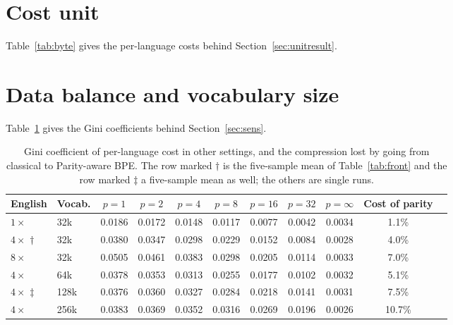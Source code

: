 \section{Cost unit}
\label{app:unit}

Table~\ref{tab:byte} gives the per-language costs behind Section~\ref{sec:unitresult}.

\begin{table}[h]
\centering
\small
{}
\caption{Tokens per sentence on devtest when the training cost is measured per byte or per
character (single runs) or per parallel sentence (five-sample mean, Table~\ref{tab:perlang}).}
\label{tab:byte}
\end{table}

\section{Data balance and vocabulary size}
\label{app:sens}

Table~\ref{tab:sens} gives the Gini coefficients behind Section~\ref{sec:sens}.

\begin{table}[h]
\centering
\small
\begin{tabular}{llccccccccc}
\toprule
English & Vocab. & $p=1$ & $p=2$ & $p=4$ & $p=8$ & $p=16$ & $p=32$ & $p=\infty$ & Cost of parity\\
\midrule
$1\times$ & 32k & 0.0186 & 0.0172 & 0.0148 & 0.0117 & 0.0077 & 0.0042 & 0.0034 & 1.1\%\\
$4\times$ $\dagger$ & 32k & 0.0380 & 0.0347 & 0.0298 & 0.0229 & 0.0152 & 0.0084 & 0.0028 & 4.0\%\\
$8\times$ & 32k & 0.0505 & 0.0461 & 0.0383 & 0.0298 & 0.0205 & 0.0114 & 0.0033 & 7.0\%\\
$4\times$ & 64k & 0.0378 & 0.0353 & 0.0313 & 0.0255 & 0.0177 & 0.0102 & 0.0032 & 5.1\%\\
$4\times$ $\ddagger$ & 128k & 0.0376 & 0.0360 & 0.0327 & 0.0284 & 0.0218 & 0.0141 & 0.0031 & 7.5\%\\
$4\times$ & 256k & 0.0383 & 0.0369 & 0.0352 & 0.0316 & 0.0269 & 0.0196 & 0.0026 & 10.7\%\\
\bottomrule
\end{tabular}
\caption{Gini coefficient of per-language cost in other settings, and the compression lost
by going from classical to Parity-aware BPE. The row marked $\dagger$ is the five-sample mean of Table~\ref{tab:front} and the row marked
$\ddagger$ a five-sample mean as well; the others are single runs.}
\label{tab:sens}
\end{table}

